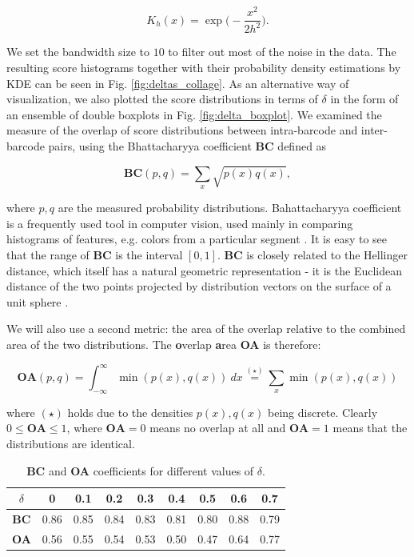 \begin{equation}
    K_h(x) = \exp \Big(- \frac{x^2}{2h^2} \Big).
\end{equation}

We set the bandwidth size to $10$ to filter out most of the noise in the data. The resulting score histograms together with their probability density estimations by KDE can be seen in Fig. \ref{fig:deltas_collage}. As an alternative way of visualization, we also plotted the score distributions in terms of $\delta$ in the form of an ensemble of double boxplots in Fig. \ref{fig:delta_boxplot}. We examined the measure of the overlap of score distributions between intra-barcode and inter-barcode pairs, using the Bhattacharyya coefficient $\textbf{BC}$ \cite{derpanis2008bhattacharyya} defined as

\begin{equation}
    \textbf{BC}(p, q) = \sum_{x} \sqrt{p(x)q(x)},
\end{equation}


where $p, q$ are the measured probability distributions. Bahattacharyya coefficient is a frequently used tool in computer vision, used mainly in comparing histograms of features, e.g. colors from a particular segment \cite{derpanis2008bhattacharyya}. It is easy to see that the range of \textbf{BC} is the interval $[0, 1]$. \textbf{BC} is closely related to the Hellinger distance, which itself has a natural geometric representation - it is the Euclidean distance of the two points projected by distribution vectors on the surface of a unit sphere \cite{harmanPersonal}.

We will also use a second metric: the area of the overlap relative to the combined area of the two distributions. The \textbf{o}verlap \textbf{a}rea \textbf{OA} is therefore:

\begin{equation}
    \textbf{OA}(p, q) = \int_{-\infty}^{\infty} \min(p(x), q(x)) ~dx \stackrel{(\star)}{=}  \sum_x \min(p(x), q(x))
\end{equation}

where $(\star)$ holds due to the densities $p(x), q(x)$ being discrete. Clearly $0 \leq \textbf{OA} \leq 1$, where $\textbf{OA} = 0$ means no overlap at all and $\textbf{OA} = 1$ means that the distributions are identical.

\begin{table}[!ht]
\centering
\begin{tabular}{|c|cccccccc|}
\hline
$\delta$ & 0 & 0.1  & 0.2  & 0.3  & 0.4  & 0.5  & 0.6  & 0.7\\
\hline
\textbf{BC} & 0.86  & 0.85 & 0.84 & 0.83 & 0.81 & 0.80 & 0.88 &  0.79\\  \hline
\textbf{OA}  & 0.56 & 0.55 & 0.54 & 0.53 & 0.50 & 0.47 & 0.64 & 0.77\\  \hline
\end{tabular}
\caption{\textbf{BC} and \textbf{OA} coefficients for different values of $\delta$.}
\label{tab:delta_measures}
\end{table}

